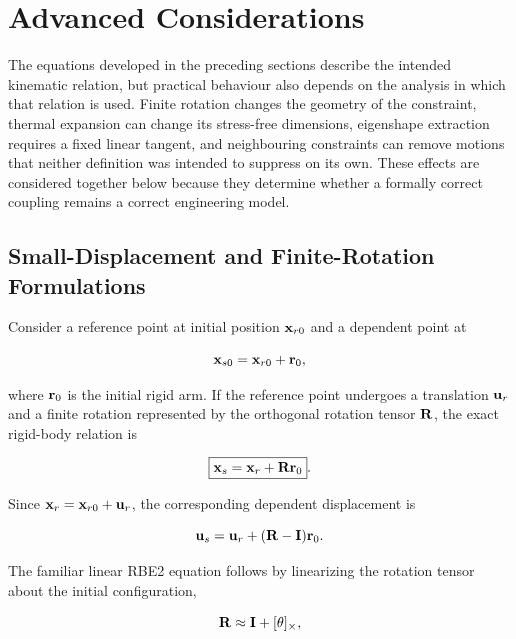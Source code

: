 \section{Advanced Considerations}

The equations developed in the preceding sections describe the intended
kinematic relation, but practical behaviour also depends on the analysis in
which that relation is used. Finite rotation changes the geometry of the
constraint, thermal expansion can change its stress-free dimensions, eigenshape
extraction requires a fixed linear tangent, and neighbouring constraints can
remove motions that neither definition was intended to suppress on its own.
These effects are considered together below because they determine whether a
formally correct coupling remains a correct engineering model.

\subsection{Small-Displacement and Finite-Rotation Formulations}\label{sec:rbe-advanced-small-large}

Consider a reference point at initial position $\mathbf{x}_{r0}$ and a dependent
point at

\begin{equation}
    \mathbf{x}_{s0}=\mathbf{x}_{r0}+\mathbf{r}_0,
\end{equation}

where $\mathbf{r}_0$ is the initial rigid arm. If the reference point undergoes a
translation $\mathbf{u}_r$ and a finite rotation represented by the orthogonal
rotation tensor $\mathbf{R}$, the exact rigid-body relation is

\begin{equation}\label{rbe-finite-rotation-relation}
    \boxed{\mathbf{x}_s=\mathbf{x}_r+\mathbf{R}\mathbf{r}_0}.
\end{equation}

Since $\mathbf{x}_r=\mathbf{x}_{r0}+\mathbf{u}_r$, the corresponding dependent displacement is

\begin{equation}\label{rbe-finite-displacement-relation}
    \mathbf{u}_s
    =\mathbf{u}_r+(\mathbf{R}-\mathbf{I})\mathbf{r}_0.
\end{equation}

The familiar linear RBE2 equation follows by linearizing the rotation tensor
about the initial configuration,

\begin{equation}
    \mathbf{R}\approx\mathbf{I}+[\mathbf{\theta}]_{\times},
\end{equation}

